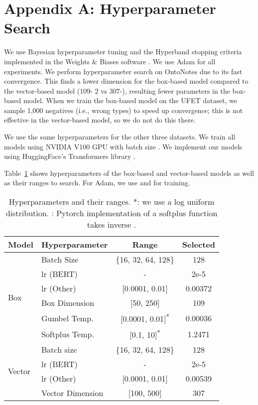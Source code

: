 \documentclass[11pt,a4paper]{article}
\begin{document}




\newpage
\appendix

\section*{Appendix A: Hyperparameter Search}\label{app:hyperparams}

We use Bayesian hyperparameter tuning and the Hyperband stopping criteria \citep{Lisha_Li_17} implemented in the Weights \& Biases software \citep{wandb}. We use Adam \citep{Kingma_14} for all experiments.  We perform hyperparameter search on OntoNotes due to its fast convergence. This finds a lower dimension for the box-based model compared to the vector-based model (109-  2 vs 307-), resulting fewer parameters in the box-based model. When we train the box-based model on the UFET dataset, we sample 1,000 negatives (i.e., wrong types) to speed up convergence; this is not effective in the vector-based model, so we do not do this there.

We use the same hyperparameters for the other three datasets. We train all models using NVIDIA V100 GPU with batch size . We implement our models using HuggingFace's Transformers library \citep{Thomas_Wolf_20}.

Table~\ref{tab:hyperparams} shows hyperparameters of the box-based and vector-based models as well as their ranges to search. For Adam, we use  and  for training. 

\renewcommand{\arraystretch}{1}
\begin{table}[H]
	\centering
	\small
	\setlength{\tabcolsep}{4pt}
\begin{tabular}{l l c c}
\toprule
		\multicolumn{1}{c}{Model} & \multicolumn{1}{c}{Hyperparameter} & \multicolumn{1}{c}{Range} & \multicolumn{1}{c}{Selected}\\
		\midrule
		\multirow{6}{*}{Box} & Batch Size & \{16, 32, 64, 128\} & 128 \\
		& lr (BERT) & - & 2e-5 \\
		& lr (Other) & [0.0001, 0.01] &  0.00372 \\
		& Box Dimension & [50, 250] & 109 \\		
		& Gumbel Temp. & [0.0001, 0.01]\textsuperscript{*} & 0.00036 \\
		& Softplus Temp.\textsuperscript{\textdagger} & [0.1, 10]\textsuperscript{*} & 1.2471 \\
		\midrule
		\multirow{4}{*}{Vector} & Batch size & \{16, 32, 64, 128\} & 128 \\
		& lr (BERT) & - & 2e-5 \\
		& lr (Other) & [0.0001, 0.01] & 0.00539  \\
		& Vector Dimension & [100, 500] & 307 \\
		\bottomrule
	\end{tabular}


	\caption{Hyperparameters and their ranges. *: we use a log uniform distribution. \textdagger: Pytorch implementation of a softplus function takes inverse . }
\label{tab:hyperparams}
\end{table}
\end{document}

